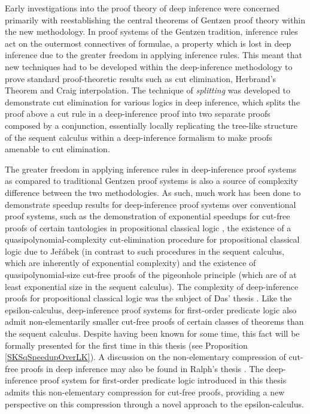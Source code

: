 \documentclass[10pt]{article}
\theoremstyle{definition}\newtheorem{remark}[theorem]{Remark}
\theoremstyle{definition}\newtheorem{example}[theorem]{Example}
\theoremstyle{definition}\newtheorem{definition}[theorem]{Definition}
\begin{document}
	Early investigations into the proof theory of deep inference were concerned primarily with reestablishing the central theorems of Gentzen proof theory within the new methodology. In proof systems of the Gentzen tradition, inference rules act on the outermost connectives of formulae, a property which is lost in deep inference due to the greater freedom in applying inference rules. This meant that new techniques had to be developed within the deep-inference methodology to prove standard proof-theoretic results such as cut elimination, Herbrand's Theorem and Craig interpolation. The technique of \textit{splitting} \cite{KaiCutElimination, AndreaAlessioSplittableSystems} was developed to demonstrate cut elimination for various logics in deep inference, which splits the proof above a cut rule in a deep-inference proof into two separate proofs composed by a conjunction, essentially locally replicating the tree-like structure of the sequent calculus within a deep-inference formalism to make proofs amenable to cut elimination.
	
	The greater freedom in applying inference rules in deep-inference proof systems as compared to traditional Gentzen proof systems is also a source of complexity difference between the two methodologies. As such, much work has been done to demonstrate speedup results for deep-inference proof systems over conventional proof systems, such as the demonstration of exponential speedups for cut-free proofs of certain tautologies in propositional classical logic \cite{BruscoliGuglielmiProofComplexity}, the existence of a quasipolynomial-complexity cut-elimination procedure for propositional classical logic due to Jeřábek \cite{JerabekComplexity, AlessioQuasipolynomial} (in contrast to such procedures in the sequent calculus, which are inherently of exponential complexity) and the existence of quasipolynomial-size cut-free proofs of the pigeonhole principle \cite{DasPigeonhole} (which are of at least exponential size in the sequent calculus). The complexity of deep-inference proofs for propositional classical logic was the subject of Das' thesis \cite{AnupamThesis}. Like the epsilon-calculus, deep-inference proof systems for first-order predicate logic also admit non-elementarily smaller cut-free proofs of certain classes of theorems than the sequent calculus. Despite having been known for some time, this fact will be formally presented for the first time in this thesis (see Proposition \ref{SKSqSpeedupOverLK}). A discussion on the non-elementary compression of cut-free proofs in deep inference may also be found in Ralph's thesis \cite{BenThesis}. The deep-inference proof system for first-order predicate logic introduced in this thesis admits this non-elementary compression for cut-free proofs, providing a new perspective on this compression through a novel approach to the epsilon-calculus.
	
\end{document}
